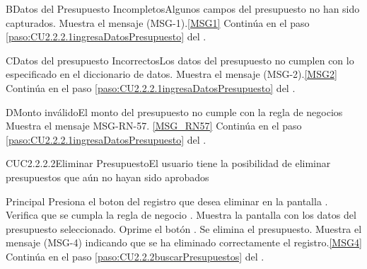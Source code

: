 	\begin{UCtrayectoriaA}{B}{Datos del Presupuesto Incompletos}{Algunos campos del presupuesto no han sido capturados.}
			\UCpaso Muestra el mensaje (MSG-1).\ref{MSG1}
			\UCpaso Continúa en el paso \ref{paso:CU2.2.2.1ingresaDatosPresupuesto} del .
	\end{UCtrayectoriaA}

	\begin{UCtrayectoriaA}{C}{Datos del presupuesto Incorrectos}{Los datos del presupuesto no cumplen con lo especificado en el diccionario de datos.}
			\UCpaso Muestra el mensaje (MSG-2).\ref{MSG2}
			\UCpaso Continúa en el paso \ref{paso:CU2.2.2.1ingresaDatosPresupuesto} del .
	\end{UCtrayectoriaA}

	\begin{UCtrayectoriaA}{D}{Monto inválido}{El monto del presupuesto no cumple con la regla de negocios }
			\UCpaso Muestra el mensaje  {MSG-RN-57}. \ref{MSG_RN57}
			\UCpaso Continúa en el paso \ref{paso:CU2.2.2.1ingresaDatosPresupuesto} del .
	\end{UCtrayectoriaA}



	\begin{UseCase}{CUC2.2.2.2}{Eliminar Presupuesto}{El usuario tiene la posibilidad de eliminar presupuestos que aún no hayan sido aprobados}
	\end{UseCase}

	\begin{UCtrayectoria}{Principal}
			\UCpaso[\UCactor] Presiona el boton  del registro que desea eliminar en la pantalla .
			\UCpaso Verifica que se cumpla la regla de negocio . 
			\UCpaso Muestra la pantalla  con los datos del presupuesto seleccionado. \label{paso:CU2.2.2.2eliminarDatosPresupuesto}
			\UCpaso [\UCactor] Oprime el botón . 
			\UCpaso Se elimina el presupuesto.
			\UCpaso Muestra el mensaje (MSG-4) indicando que se ha eliminado correctamente el registro.\ref{MSG4}
			\UCpaso Continúa en el paso \ref{paso:CU2.2.2buscarPresupuestos} del .
	\end{UCtrayectoria}


